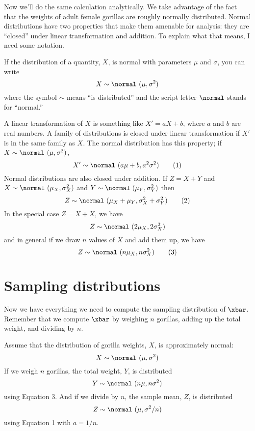 \documentclass[12pt]{book}
\begin{document}
Now we'll do the same calculation analytically.  We
take advantage of the fact that the weights of adult female gorillas
are roughly normally distributed.  Normal distributions have two
properties that make them amenable for analysis: they are ``closed'' under
linear transformation and addition.  To explain what that means, I
need some notation.  

If the distribution of a quantity, $X$, is
normal with parameters $\mu$ and $\sigma$, you can write
%
\[ X \sim \normal~(\mu, \sigma^{2})\]
%
where the symbol $\sim$ means ``is distributed'' and the script letter
$\normal$ stands for ``normal.''


A linear transformation of $X$ is something like $X' = a X + b$, where
$a$ and $b$ are real numbers.
A family of distributions is closed under
linear transformation if $X'$ is in the same family as $X$.  The normal
distribution has this property; if $X \sim \normal~(\mu,
\sigma^2)$,
%
\[ X' \sim \normal~(a \mu + b, a^{2} \sigma^2) \tag*{(1)} \]
%
Normal distributions are also closed under addition.  
If $Z = X + Y$ and
$X \sim \normal~(\mu_{X}, \sigma_{X}^{2})$ and
$Y \sim \normal~(\mu_{Y}, \sigma_{Y}^{2})$ then
%
\[ Z \sim \normal~(\mu_X + \mu_Y, \sigma_X^2 + \sigma_Y^2)  \tag*{(2)}\]
%
In the special case $Z = X + X$, we have
%
\[ Z \sim \normal~(2 \mu_X, 2 \sigma_X^2) \]
%
and in general if we draw $n$ values of $X$ and add them up, we have
%
\[ Z \sim \normal~(n \mu_X, n \sigma_X^2)  \tag*{(3)}\]


\section{Sampling distributions}

Now we have everything we need to compute the sampling distribution of
$\xbar$.  Remember that we compute $\xbar$ by weighing $n$ gorillas,
adding up the total weight, and dividing by $n$.

Assume that the distribution of gorilla weights, $X$, is
approximately normal:
%
\[ X \sim \normal~(\mu, \sigma^2)\]
%
If we weigh $n$ gorillas, the total weight, $Y$, is distributed
%
\[ Y \sim \normal~(n \mu, n \sigma^2) \]
%
using Equation 3.  And if we divide by $n$, the sample mean,
$Z$, is distributed
%
\[ Z \sim \normal~(\mu, \sigma^2/n) \]
%
using Equation 1 with $a = 1/n$.
\end{document}
